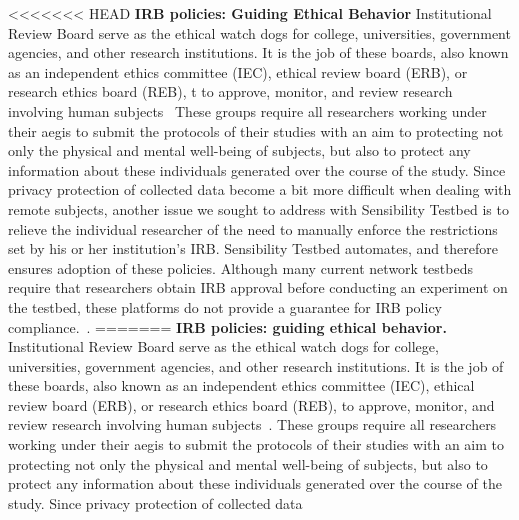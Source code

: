 {<<<<<<< HEAD
\textbf{IRB policies: Guiding Ethical Behavior}
Institutional Review Board serve as the ethical watch dogs for college, universities, government agencies, and other research institutions. It is the job of these boards, also known as an independent ethics committee (IEC), ethical 
review board (ERB), or research ethics board (REB), 
t to approve, monitor, and review 
research involving human subjects~\cite{irb} These groups require all researchers working under their aegis to submit the protocols of their studies with an aim to protecting not only the physical and mental well-being of subjects, but also to protect any information about these individuals generated over the course of the study. Since privacy protection of collected data become a bit more difficult when dealing with remote subjects, another issue we sought to address with Sensibility Testbed is to 
relieve the individual researcher of the need to manually enforce 
the restrictions set by his or her institution's IRB.
Sensibility Testbed automates, and therefore ensures adoption of these policies. Although many current network 
testbeds require that researchers obtain IRB approval before conducting
an experiment on the testbed, these platforms do not provide a guarantee 
for IRB policy compliance.~\cite{nandugudi2013phonelab, nikravesh2015mobilyzer}. 
=======
\textbf{IRB policies: guiding ethical behavior.}
Institutional Review Board serve as the ethical watch dogs for college, 
universities, government agencies, and other research institutions. 
It is the job of these boards, also known as an independent ethics committee 
(IEC), ethical review board (ERB), or research ethics board (REB), 
to approve, monitor, and review research involving human 
subjects~\cite{irb}. These groups require all researchers working under 
their aegis to submit the protocols of their studies with an aim to 
protecting not only the physical and mental well-being of subjects, 
but also to protect any information about these individuals generated 
over the course of the study. Since privacy protection of collected data 
}
